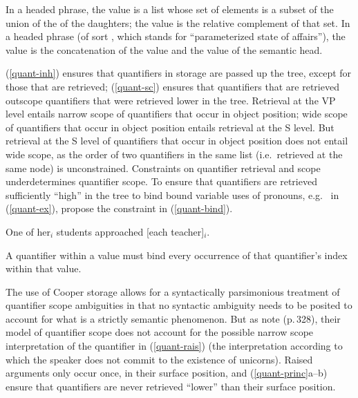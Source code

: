 \documentclass[output=paper,biblatex,babelshorthands,newtxmath,draftmode,colorlinks,citecolor=brown]{langscibook}
\begin{document}
\eal \label{quant-princ}
\ex\label{quant-inh}
In a headed phrase, the  value is a list whose set of elements is a subset of the union of the  of the daughters; the  value is the relative complement of that set.
\ex\label{quant-sc}
In a headed phrase (of sort , which stands for ``parameterized state of affairs''), the  value is the concatenation of the  value and the  value of the semantic head.
\zl

\noindent
(\ref{quant-inh}) ensures that quantifiers in storage are passed up the tree, except for those that are retrieved; (\ref{quant-sc}) ensures that quantifiers that are retrieved outscope quantifiers that were retrieved lower in the tree. Retrieval at the VP level entails narrow scope of quantifiers that occur in object position; wide scope of quantifiers that occur in object position entails retrieval at the S level. But retrieval at the S level of quantifiers that occur in object position does not entail wide scope, as the order of two quantifiers in the same  list (i.e.\ retrieved at the same node) is unconstrained. Constraints on quantifier retrieval and scope underdetermines quantifier scope. To ensure that quantifiers are retrieved sufficiently ``high'' in the tree to bind bound variable uses of pronouns, e.g.\  in (\ref{quant-ex}), \citeauthor{PollardandSag1994} propose the constraint in (\ref{quant-bind}).

\begin{exe}
\ex\label{quant-ex}
One of her$_{i}$ students approached [each teacher]$_{i}$. \citep[327]{PollardandSag1994}
\end{exe}

\begin{exe}
\ex\label{quant-bind}A quantifier within a  value must bind every occurrence of that quantifier's index within that  value.  
\end{exe}

The use of Cooper storage allows for a syntactically parsimonious treatment of quantifier scope ambiguities in that no syntactic ambiguity needs to be posited to account for what is a strictly semantic phenomenon. But as \citeauthor{PollardandSag1994} note (p.\,328), their model of quantifier scope does not account for the possible narrow scope interpretation of the quantifier  in (\ref{quant-rais}) (the interpretation according to which the speaker does not commit to the existence of unicorns). Raised arguments only occur once, in their surface position, and (\ref{quant-princ}a--b) ensure that quantifiers are never retrieved ``lower'' than their surface position.
\end{document}
